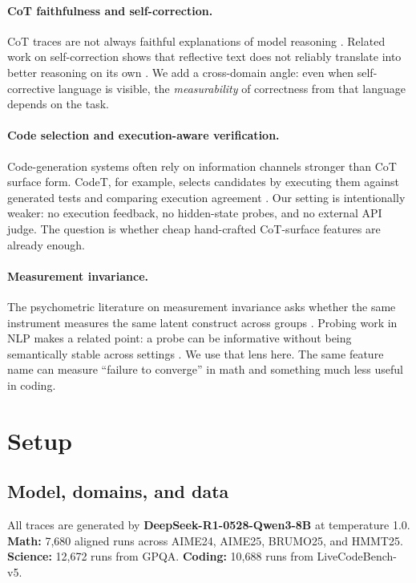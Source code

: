 \documentclass[10pt,twocolumn]{article}
\begin{document}
\paragraph{CoT faithfulness and self-correction.}
CoT traces are not always faithful explanations of model reasoning \citep{lanham2023faithfulness}. Related work on self-correction shows that reflective text does not reliably translate into better reasoning on its own \citep{huang2024selfcorrect,liu2024intrinsic,madaan2023selfrefine,shinn2023reflexion}. We add a cross-domain angle: even when self-corrective language is visible, the \emph{measurability} of correctness from that language depends on the task.

\paragraph{Code selection and execution-aware verification.}
Code-generation systems often rely on information channels stronger than CoT surface form. CodeT, for example, selects candidates by executing them against generated tests and comparing execution agreement \citep{chen2022codet}. Our setting is intentionally weaker: no execution feedback, no hidden-state probes, and no external API judge. The question is whether cheap hand-crafted CoT-surface features are already enough.

\paragraph{Measurement invariance.}
The psychometric literature on measurement invariance asks whether the same instrument measures the same latent construct across groups \citep{vandenberg2000review}. Probing work in NLP makes a related point: a probe can be informative without being semantically stable across settings \citep{belinkov2022probing}. We use that lens here. The same feature name can measure ``failure to converge'' in math and something much less useful in coding.

\section{Setup}
\label{sec:setup}

\subsection{Model, domains, and data}

All traces are generated by \textbf{DeepSeek-R1-0528-Qwen3-8B} at temperature 1.0.
\textbf{Math:} 7,680 aligned runs across AIME24, AIME25, BRUMO25, and HMMT25.
\textbf{Science:} 12,672 runs from GPQA.
\textbf{Coding:} 10,688 runs from LiveCodeBench-v5.
\end{document}
